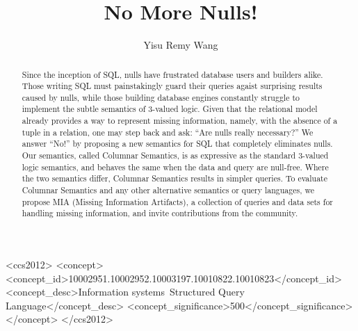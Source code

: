 \documentclass[sigconf,nonacm]{acmart}
\begin{document}
\title{No More Nulls!}
\author{Yisu Remy Wang}

\begin{abstract}
Since the inception of SQL, 
 nulls have frustrated database users and builders alike.
Those writing SQL must painstakingly
 guard their queries agaist surprising results caused by nulls,
 while those building database engines
 constantly struggle to implement the subtle semantics of 3-valued logic.
Given that the relational model already provides a way 
 to represent missing information,
 namely, with the absence of a tuple in a relation,
 one may step back and ask: ``Are nulls really necessary?''
We answer ``No!'' by proposing a new semantics for SQL
 that completely eliminates nulls.
Our semantics, called Columnar Semantics, 
 is as expressive as the standard 3-valued logic semantics,
 and behaves the same when the data and query are null-free.
Where the two semantics differ, Columnar Semantics results in simpler queries.
To evaluate Columnar Semantics and any other alternative semantics 
 or query languages, 
 we propose MIA (Missing Information Artifacts),
 a collection of queries and data sets for handling missing information,
 and invite contributions from the community.
\end{abstract}

\begin{CCSXML}
  <ccs2012>
  <concept>
  <concept_id>10002951.10002952.10003197.10010822.10010823</concept_id>
  <concept_desc>Information systems~Structured Query Language</concept_desc>
  <concept_significance>500</concept_significance>
  </concept>
  </ccs2012>
\end{CCSXML}
  


\maketitle
\end{document}
